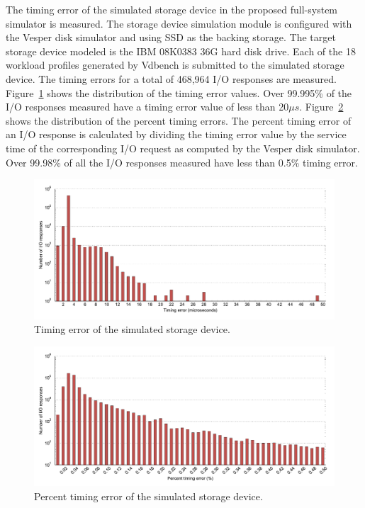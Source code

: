 The timing error of the simulated storage device in the proposed full-system simulator is measured. The storage device simulation module is configured with the Vesper disk simulator and using SSD as the backing storage. The target storage device modeled is the IBM 08K0383 36G hard disk drive. Each of the 18 workload profiles generated by Vdbench is submitted to the simulated storage device. The timing errors for a total of 468,964 I/O responses are measured. Figure~\ref{fig:ch5-fig-15a} shows the distribution of the timing error values. Over 99.995\% of the I/O responses measured have a timing error value of less than 20$\mu s$. Figure~\ref{fig:ch5-fig-15b} shows the distribution of the percent timing errors. The percent timing error of an I/O response is calculated by dividing the timing error value by the service time of the corresponding I/O request as computed by the Vesper disk simulator. Over 99.98\% of all the I/O responses measured have less than 0.5\% timing error.

\begin{figure}[htpb]
	\centering
	\includegraphics[width=\textwidth]{figures/ch5-fig-15a.pdf}
	\caption{\label{fig:ch5-fig-15a}Timing error of the simulated storage device.}
\end{figure}

\begin{figure}[htpb]
	\centering
	\includegraphics[width=\textwidth]{figures/ch5-fig-15b.pdf}
	\caption{\label{fig:ch5-fig-15b}Percent timing error of the simulated storage device.}
\end{figure}


